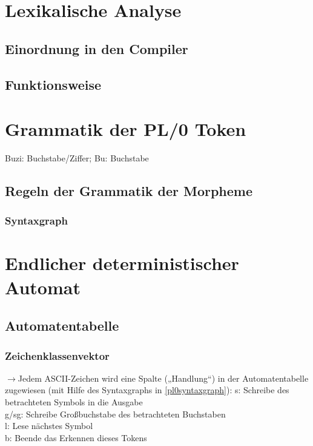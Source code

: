 \section{Lexikalische Analyse}

\subsection{Einordnung in den Compiler}

\subsection{Funktionsweise}

\section{Grammatik der PL/0 Token}
Buzi: Buchstabe/Ziffer; Bu: Buchstabe
\subsection{Regeln der Grammatik der Morpheme}
\subsubsection*{Syntaxgraph}
\label{pl0syntaxgraph}

\section{Endlicher deterministischer Automat}

\subsection{Automatentabelle}
\subsubsection{Zeichenklassenvektor}
$\to$Jedem ASCII-Zeichen wird eine Spalte („Handlung“) in der Automatentabelle zugewiesen (mit Hilfe des Syntaxgraphs in \autoref{pl0syntaxgraph}):
s: Schreibe des betrachteten Symbols in die Ausgabe\\
g/sg: Schreibe Großbuchstabe des betrachteten Buchstaben\\
l: Lese nächstes Symbol\\
b: Beende das Erkennen dieses Tokens

